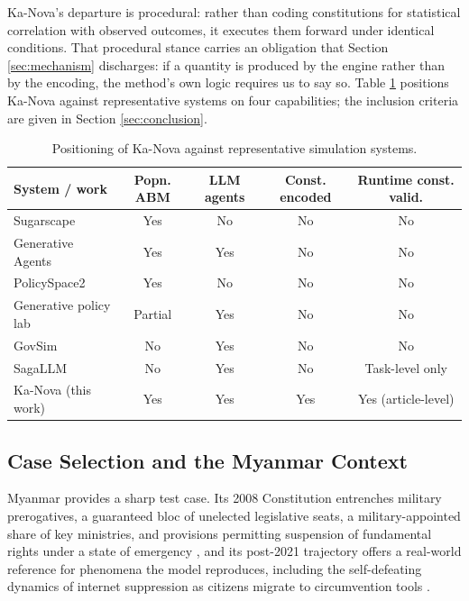 \documentclass{ieeeaccess}
\begin{document}
Ka-Nova's departure is procedural: rather than coding constitutions for
statistical correlation with observed outcomes, it executes them forward
under identical conditions. That procedural stance carries an obligation
that Section \ref{sec:mechanism} discharges: if a quantity is produced
by the engine rather than by the encoding, the method's own logic
requires us to say so. Table \ref{tab:positioning} positions Ka-Nova
against representative systems on four capabilities; the inclusion
criteria are given in Section \ref{sec:conclusion}.

\begin{table}[!t]
\caption{Positioning of Ka-Nova against representative simulation
systems.}
\label{tab:positioning}
\centering
\small
\begin{tabular}{@{}lcccc@{}}
\toprule
System / work & Popn. ABM & LLM agents & Const. encoded & Runtime const. valid. \\
\midrule
Sugarscape \cite{epstein1996growing}      & Yes     & No  & No  & No \\
Generative Agents \cite{park2023generative} & Yes   & Yes & No  & No \\
PolicySpace2 \cite{furtado2022policyspace2} & Yes   & No  & No  & No \\
Generative policy lab \cite{piao2025gplab}  & Partial & Yes & No & No \\
GovSim \cite{piatti2024cooperate}           & No    & Yes & No  & No \\
SagaLLM \cite{sagallm2025}                  & No    & Yes & No  & Task-level only \\
Ka-Nova (this work)                         & Yes   & Yes & Yes & Yes (article-level) \\
\bottomrule
\end{tabular}
\end{table}

\subsection{Case Selection and the Myanmar Context}
Myanmar provides a sharp test case. Its 2008 Constitution entrenches
military prerogatives, a guaranteed bloc of unelected legislative seats,
a military-appointed share of key ministries, and provisions permitting
suspension of fundamental rights under a state of emergency
\cite{myanmar2008constitution,crouch2019myanmar}, and its post-2021
trajectory offers a real-world reference for phenomena the model
reproduces, including the self-defeating dynamics of internet
suppression as citizens migrate to circumvention tools
\cite{accessnow2023keepiton}.
\end{document}
